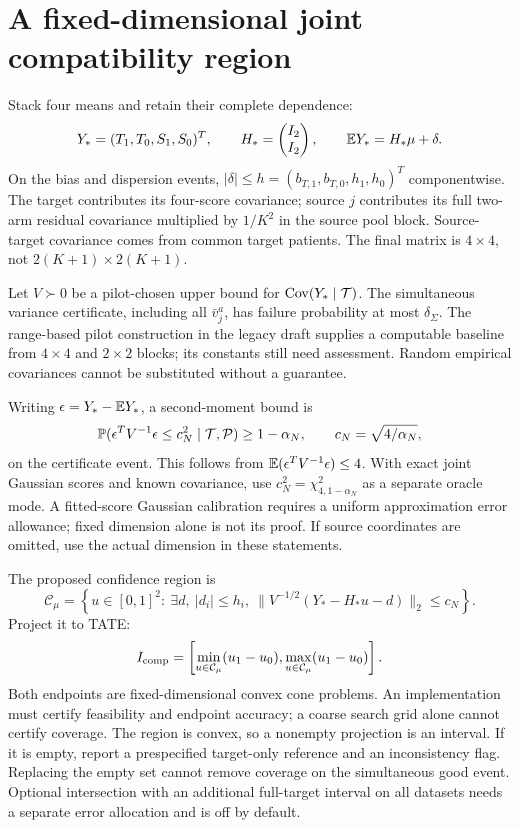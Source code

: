 \section{A fixed-dimensional joint compatibility region}

Stack four means and retain their complete dependence:
\[
 Y_*=(T_1,T_0,S_1,S_0)^T,\qquad
 H_*=\begin{pmatrix}I_2\\I_2\end{pmatrix},\qquad
 \mathbb E Y_*=H_*\mu+\delta.
\]
On the bias and dispersion events,
$|\delta|\le h=(b_{T,1},b_{T,0},h_1,h_0)^T$ componentwise.
The target contributes its four-score covariance; source $j$ contributes
its full two-arm residual covariance multiplied by $1/K^2$ in the source
pool block. Source-target covariance comes from common target patients.
The final matrix is $4\times4$, not $2(K+1)\times2(K+1)$.

Let $V\succ0$ be a pilot-chosen upper bound for $\operatorname{Cov}(Y_*\mid\mathcal T)$.
The simultaneous variance certificate, including all $\bar v_j^a$, has
failure probability at most $\delta_\Sigma$. The range-based pilot
construction in the legacy draft supplies a computable baseline from
$4\times4$ and $2\times2$ blocks; its constants still need assessment.
Random empirical covariances cannot be substituted without a guarantee.

Writing $\epsilon=Y_*-\mathbb E Y_*$, a second-moment bound is
\[
 \mathbb P(\epsilon^TV^{-1}\epsilon\le c_N^2\mid\mathcal T,\mathcal P)
 \ge1-\alpha_N,\qquad c_N=\sqrt{4/\alpha_N},
\]
on the certificate event. This follows from
$\mathbb E(\epsilon^TV^{-1}\epsilon)\le4$. With exact joint Gaussian scores and
known covariance, use $c_N^2=\chi^2_{4,1-\alpha_N}$ as a separate oracle
mode. A fitted-score Gaussian calibration requires a uniform approximation
error allowance; fixed dimension alone is not its proof. If source
coordinates are omitted, use the actual dimension in these statements.

The proposed confidence region is
\begin{equation}
 \mathcal C_\mu=\left\{u\in[0,1]^2:\ \exists d,\ |d_i|\le h_i,
 \ \|V^{-1/2}(Y_*-H_*u-d)\|_2\le c_N\right\}.
 \label{eq:v2-region}
\end{equation}
Project it to TATE:
\[
 I_{\rm comp}=\left[\min_{u\in\mathcal C_\mu}(u_1-u_0),
                       \max_{u\in\mathcal C_\mu}(u_1-u_0)\right].
\]
Both endpoints are fixed-dimensional convex cone problems. An implementation
must certify feasibility and endpoint accuracy; a coarse search grid alone
cannot certify coverage. The region is convex, so a nonempty projection is
an interval. If it is empty, report a prespecified target-only reference and
an inconsistency flag. Replacing the empty set cannot remove coverage on the
simultaneous good event. Optional intersection with an additional full-target
interval on all datasets needs a separate error allocation and is off by
default.

